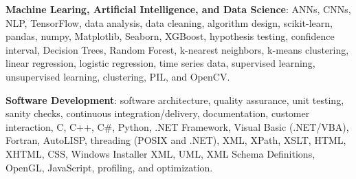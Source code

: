 \documentclass{leresume}
\begin{document}
    
    

    \begin{bulletedlist}
		
		\item \textbf{Machine Learing, Artificial Intelligence, and Data Science}: ANNs,
                        CNNs,
                        NLP,
                        TensorFlow,
                        data analysis,
                        data cleaning,
                        algorithm design,
                        scikit-learn,
                        pandas,
                        numpy,
                        Matplotlib,
                        Seaborn,
                        XGBoost,
                        hypothesis testing,
                        confidence interval,
                        Decision Trees,
                        Random Forest,
                        k-nearest neighbors,
                        k-means clustering,
                        linear regression,
                        logistic regression,
                        time series data,
                        supervised learning,
                        unsupervised learning,
                        clustering,
                        PIL,
                        and OpenCV.
                        
		\item \textbf{Software Development}: software architecture,
                        quality assurance,
                        unit testing,
                        sanity checks,
                        continuous integration/delivery,
                        documentation,
                        customer interaction,
                        C,
                        C++,
                        C\#,
                        Python,
                        .NET Framework,
                        Visual Basic (.NET/VBA),
                        Fortran,
                        AutoLISP,
                        threading (POSIX and .NET),
                        XML,
                        XPath,
                        XSLT,
                        HTML,
                        XHTML,
                        CSS,
                        Windows Installer XML,
                        UML,
                        XML Schema Definitions,
                        OpenGL,
                        JavaScript,
                        profiling,
                        and optimization.
                        

\end{bulletedlist}
\end{document}

